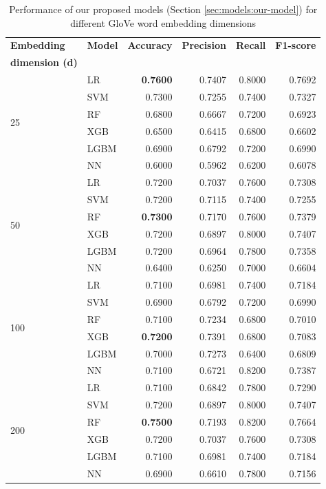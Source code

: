 \begin{table}[htbp]
\centering
\begin{tabular}{llrrrr}
\hline
\textbf{Embedding} & \textbf{Model} & \multicolumn{1}{l}{\textbf{Accuracy}} & \multicolumn{1}{l}{\textbf{Precision}} & \multicolumn{1}{l}{\textbf{Recall}} & \multicolumn{1}{l}{\textbf{F1-score}} \\
\textbf{dimension (d)} &  & \multicolumn{1}{l}{} & \multicolumn{1}{l}{} & \multicolumn{1}{l}{} & \multicolumn{1}{l}{} \\ \hline
\multirow{6}{*}{25} & LR & \textbf{0.7600} & 0.7407 & 0.8000 & 0.7692 \\
 & SVM & 0.7300 & 0.7255 & 0.7400 & 0.7327 \\
 & RF & 0.6800 & 0.6667 & 0.7200 & 0.6923 \\
 & XGB & 0.6500 & 0.6415 & 0.6800 & 0.6602 \\
 & LGBM & 0.6900 & 0.6792 & 0.7200 & 0.6990 \\
 & NN & 0.6000 & 0.5962 & 0.6200 & 0.6078 \\ \cline{2-6} 
\multirow{6}{*}{50} & LR & 0.7200 & 0.7037 & 0.7600 & 0.7308 \\
 & SVM & 0.7200 & 0.7115 & 0.7400 & 0.7255 \\
 & RF & \textbf{0.7300} & 0.7170 & 0.7600 & 0.7379 \\
 & XGB & 0.7200 & 0.6897 & 0.8000 & 0.7407 \\
 & LGBM & 0.7200 & 0.6964 & 0.7800 & 0.7358 \\
 & NN & 0.6400 & 0.6250 & 0.7000 & 0.6604 \\ \hline
\multirow{6}{*}{100} & LR & 0.7100 & 0.6981 & 0.7400 & 0.7184 \\
 & SVM & 0.6900 & 0.6792 & 0.7200 & 0.6990 \\
 & RF & 0.7100 & 0.7234 & 0.6800 & 0.7010 \\
 & XGB & \textbf{0.7200} & 0.7391 & 0.6800 & 0.7083 \\
 & LGBM & 0.7000 & 0.7273 & 0.6400 & 0.6809 \\
 & NN & 0.7100 & 0.6721 & 0.8200 & 0.7387 \\ \hline
\multirow{6}{*}{200} & LR & 0.7100 & 0.6842 & 0.7800 & 0.7290 \\
 & SVM & 0.7200 & 0.6897 & 0.8000 & 0.7407 \\
 & RF & \textbf{0.7500} & 0.7193 & 0.8200 & 0.7664 \\
 & XGB & 0.7200 & 0.7037 & 0.7600 & 0.7308 \\
 & LGBM & 0.7100 & 0.6981 & 0.7400 & 0.7184 \\
 & NN & 0.6900 & 0.6610 & 0.7800 & 0.7156 \\ \cline{2-6} 
\end{tabular}
\caption[Performance of our proposed models (Section \ref{sec:models:our-model}) for different \texorpdfstring{GloVe}{GloVe} word embedding dimensions]{Performance of our proposed models (Section \ref{sec:models:our-model}) for different \ac{GloVe} word embedding dimensions}
\label{tab:results:performance-our-model}
\end{table}

